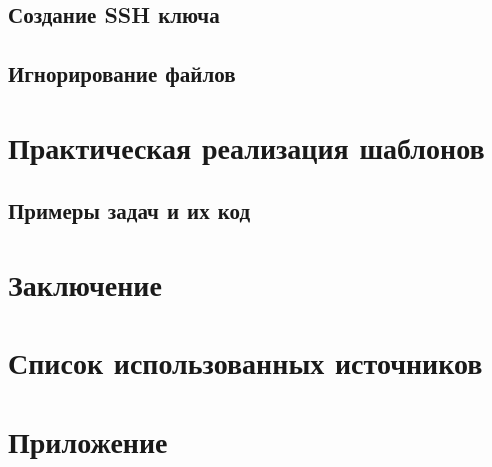 \documentclass[oneside,final,14pt]{extarticle} %
\begin{document}
\subsection{Создание SSH ключа}

\newpage

\subsection{Игнорирование файлов}

\newpage

\section{Практическая реализация шаблонов}
\subsection{Примеры задач и их код}

\newpage

\newpage
\section*{Заключение}

\newpage

\section*{Список использованных источников}
\setlength{\parindent}{0cm}

\newpage

\section*{Приложение}
\setlength{\parindent}{0cm}
\newpage

\appendix
\end{document}
